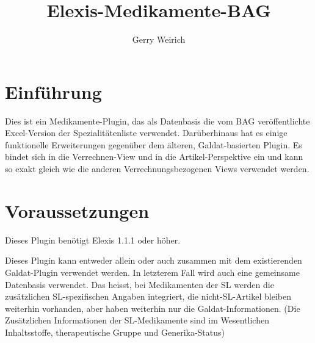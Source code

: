 \documentclass[a4paper]{scrartcl}
\title{Elexis-Medikamente-BAG}
\author{Gerry Weirich}
\begin{document}
\maketitle
\section{Einführung}

Dies ist ein Medikamente-Plugin, das als Datenbasis die vom BAG veröffentlichte Excel\texttrademark-Version der Spezialitätenliste verwendet. Darüberhinaus hat es einige funktionelle Erweiterungen gegenüber dem älteren, Galdat-basierten Plugin. Es bindet sich in die Verrechnen-View und in die Artikel-Perspektive ein und kann so exakt gleich wie die anderen Verrechnungsbezogenen Views verwendet werden.

\section{Voraussetzungen}
Dieses Plugin benötigt Elexis 1.1.1 oder höher.

\medskip

Dieses Plugin kann entweder allein oder auch zusammen mit dem existierenden Galdat-Plugin verwendet werden. In letzterem Fall wird auch eine gemeinsame Datenbasis verwendet. Das heisst, bei Medikamenten der SL werden die zusätzlichen SL-spezifischen Angaben integriert, die nicht-SL-Artikel bleiben weiterhin vorhanden, aber haben weiterhin nur die Galdat-Informationen. (Die Zusätzlichen Informationen der SL-Medikamente sind im Wesentlichen Inhaltsstoffe, therapeutische Gruppe und Generika-Status)
\end{document}
